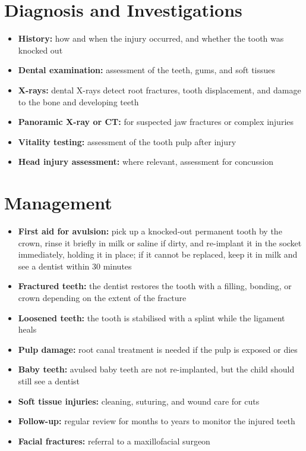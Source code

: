 \section*{Diagnosis and Investigations}
\begin{itemize}
    \item \textbf{History:} how and when the injury occurred, and whether the tooth was knocked out
    \item \textbf{Dental examination:} assessment of the teeth, gums, and soft tissues
    \item \textbf{X-rays:} dental X-rays detect root fractures, tooth displacement, and damage to the bone and developing teeth
    \item \textbf{Panoramic X-ray or CT:} for suspected jaw fractures or complex injuries
    \item \textbf{Vitality testing:} assessment of the tooth pulp after injury
    \item \textbf{Head injury assessment:} where relevant, assessment for concussion
\end{itemize}

\section*{Management}
\begin{itemize}
    \item \textbf{First aid for avulsion:} pick up a knocked-out permanent tooth by the crown, rinse it briefly in milk or saline if dirty, and re-implant it in the socket immediately, holding it in place; if it cannot be replaced, keep it in milk and see a dentist within 30 minutes
    \item \textbf{Fractured teeth:} the dentist restores the tooth with a filling, bonding, or crown depending on the extent of the fracture
    \item \textbf{Loosened teeth:} the tooth is stabilised with a splint while the ligament heals
    \item \textbf{Pulp damage:} root canal treatment is needed if the pulp is exposed or dies
    \item \textbf{Baby teeth:} avulsed baby teeth are not re-implanted, but the child should still see a dentist
    \item \textbf{Soft tissue injuries:} cleaning, suturing, and wound care for cuts
    \item \textbf{Follow-up:} regular review for months to years to monitor the injured teeth
    \item \textbf{Facial fractures:} referral to a maxillofacial surgeon
\end{itemize}


